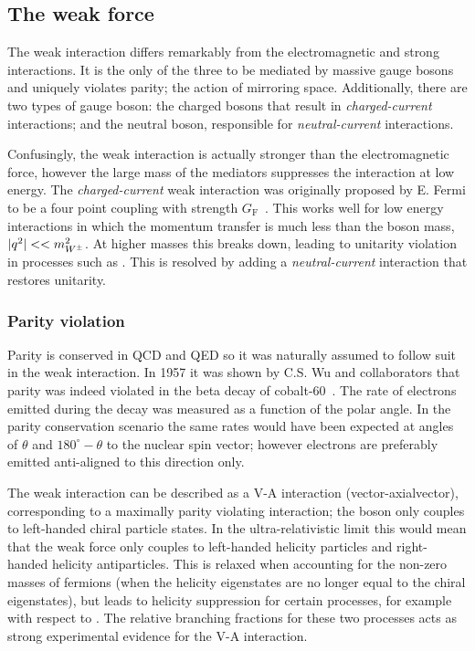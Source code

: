 \subsection{The weak force}

The weak interaction differs remarkably from the electromagnetic and strong interactions. It is the only of the three to be mediated by massive gauge bosons and uniquely violates parity; the action of mirroring space. 
Additionally, there are two types of gauge boson: the charged \Wpm bosons that result in \emph{charged-current} interactions; and the neutral \Z boson, responsible for \emph{neutral-current} interactions. 

Confusingly, the weak interaction is actually stronger than the electromagnetic force, however the large mass of the mediators suppresses the interaction at low energy.
The \emph{charged-current} weak interaction was originally proposed by E. Fermi to be a four point coupling with strength $G_{\text{F}}$~\cite{Fermi2008}. 
This works well for low energy interactions in which the momentum transfer is much less than the \Wpm boson mass, $|q^{2}|<<m_{W^\pm}^2$. At higher masses this breaks down, leading to unitarity violation in processes such as \decay{\ep\en}{\Wp\Wm}. This is resolved by adding a \emph{neutral-current} interaction that restores unitarity. 


\subsubsection{Parity violation}
Parity is conserved in QCD and QED so it was naturally assumed to follow suit in the weak interaction. In 1957 it was shown by C.S. Wu and collaborators that parity was indeed violated in the beta decay of cobalt-60~\cite{PhysRev.105.1413}. The rate of electrons emitted during the decay was measured as a function of the polar angle. In the parity conservation scenario the same rates would have been expected at angles of $\theta$ and $180^\circ-\theta$ to the nuclear spin vector; however electrons are preferably emitted anti-aligned to this direction only.          

The weak interaction can be described as a V-A interaction (vector-axialvector), corresponding to a maximally parity violating interaction; the \Wpm boson only couples to left-handed chiral particle states. In the ultra-relativistic limit this would mean that the weak force only couples to left-handed helicity particles and right-handed helicity antiparticles. This is relaxed when accounting for the non-zero masses of fermions (when the helicity eigenstates are no longer equal to the chiral eigenstates), but leads to helicity suppression for certain processes, for example \decay{\pim}{\en\neueb} with respect to \decay{\pim}{\mun\neumb}. The relative branching fractions for these two processes acts as strong experimental evidence for the V-A interaction.

